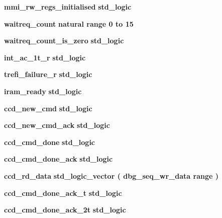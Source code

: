 \begin{DoxyCompactItemize}
\item 
{\bf mmi\+\_\+rw\+\_\+regs\+\_\+initialised} {\bfseries \textcolor{comment}{std\+\_\+logic}\textcolor{vhdlchar}{ }} 
\item 
{\bf waitreq\+\_\+count} {\bfseries \textcolor{comment}{natural}\textcolor{vhdlchar}{ }\textcolor{vhdlchar}{ }\textcolor{vhdlchar}{ }\textcolor{keywordflow}{range}\textcolor{vhdlchar}{ }\textcolor{vhdlchar}{ } \textcolor{vhdldigit}{0} \textcolor{vhdlchar}{ }\textcolor{keywordflow}{to}\textcolor{vhdlchar}{ }\textcolor{vhdlchar}{ } \textcolor{vhdldigit}{15} \textcolor{vhdlchar}{ }} 
\item 
{\bf waitreq\+\_\+count\+\_\+is\+\_\+zero} {\bfseries \textcolor{comment}{std\+\_\+logic}\textcolor{vhdlchar}{ }} 
\item 
{\bf int\+\_\+ac\+\_\+1t\+\_\+r} {\bfseries \textcolor{comment}{std\+\_\+logic}\textcolor{vhdlchar}{ }} 
\item 
{\bf trefi\+\_\+failure\+\_\+r} {\bfseries \textcolor{comment}{std\+\_\+logic}\textcolor{vhdlchar}{ }} 
\item 
{\bf iram\+\_\+ready} {\bfseries \textcolor{comment}{std\+\_\+logic}\textcolor{vhdlchar}{ }} 
\item 
{\bf ccd\+\_\+new\+\_\+cmd} {\bfseries \textcolor{comment}{std\+\_\+logic}\textcolor{vhdlchar}{ }} 
\item 
{\bf ccd\+\_\+new\+\_\+cmd\+\_\+ack} {\bfseries \textcolor{comment}{std\+\_\+logic}\textcolor{vhdlchar}{ }} 
\item 
{\bf ccd\+\_\+cmd\+\_\+done} {\bfseries \textcolor{comment}{std\+\_\+logic}\textcolor{vhdlchar}{ }} 
\item 
{\bf ccd\+\_\+cmd\+\_\+done\+\_\+ack} {\bfseries \textcolor{comment}{std\+\_\+logic}\textcolor{vhdlchar}{ }} 
\item 
{\bf ccd\+\_\+rd\+\_\+data} {\bfseries \textcolor{comment}{std\+\_\+logic\+\_\+vector}\textcolor{vhdlchar}{ }\textcolor{vhdlchar}{(}\textcolor{vhdlchar}{ }{\bfseries {\bf dbg\+\_\+seq\+\_\+wr\+\_\+data}} \textcolor{vhdlchar}{ }\textcolor{vhdlchar}{\textquotesingle{}}\textcolor{vhdlchar}{ }\textcolor{keywordflow}{range}\textcolor{vhdlchar}{ }\textcolor{vhdlchar}{ }\textcolor{vhdlchar}{)}\textcolor{vhdlchar}{ }} 
\item 
{\bf ccd\+\_\+cmd\+\_\+done\+\_\+ack\+\_\+t} {\bfseries \textcolor{comment}{std\+\_\+logic}\textcolor{vhdlchar}{ }} 
\item 
{\bf ccd\+\_\+cmd\+\_\+done\+\_\+ack\+\_\+2t} {\bfseries \textcolor{comment}{std\+\_\+logic}\textcolor{vhdlchar}{ }} 

\end{DoxyCompactItemize}
